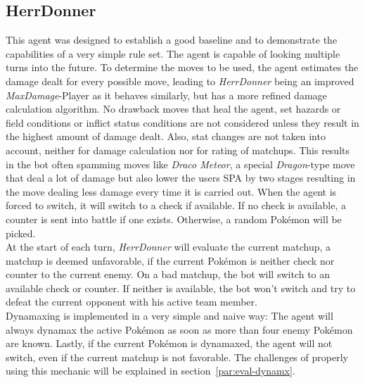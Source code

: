 \subsection{HerrDonner}
This agent was designed to establish a good baseline and to demonstrate the capabilities of a very
simple rule set. The agent is capable of looking multiple turns into the future. 
To determine the moves to be used, the agent estimates the damage dealt for every possible move, leading
to \textit{HerrDonner} being an improved \textit{MaxDamage}-Player as it behaves similarly, but 
has a more refined damage calculation algorithm.
No drawback moves that heal the agent, set hazards or field conditions or inflict status conditions
are not considered unless they result in the highest amount of damage dealt. Also, stat changes are 
not taken into account, neither for damage calculation nor for rating of matchups. 
This results in the bot often spamming moves like \textit{Draco Meteor}, a special 
\textit{Dragon}-type move that deal a lot of damage but also lower the
users \ac{SPA} by two stages resulting in the move dealing less damage every time it is carried out. 
When the agent is forced to switch, it will switch to a check if available. If no check is available,
a counter is sent into battle if one exists. Otherwise, a random Pokémon will be picked. \\
At the start of each turn, \textit{HerrDonner} will evaluate the current matchup, 
a matchup is deemed unfavorable, if the current Pokémon is neither check nor 
counter to the current enemy. On a bad matchup, the bot will switch to an available 
check or counter. If neither is available, the bot won't switch and try to
defeat the current opponent with his active team member. \\
Dynamaxing is implemented in a very simple and naive way: The agent will always dynamax the
active Pokémon as soon as more than four enemy Pokémon are known. Lastly, if the
current Pokémon is dynamaxed, the agent will not switch, even if the current matchup is not
favorable. The challenges of properly using this mechanic will be explained in section~\ref{par:eval-dynamx}.

